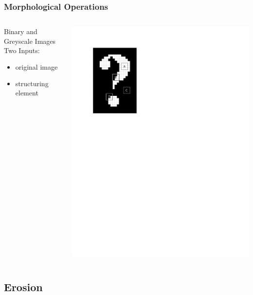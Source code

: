 \documentclass{beamer}
\begin{document}
\begin{frame}
\frametitle{Morphological Operations}
\begin{columns}
\begin{column}{0.5\textwidth}
Binary and Greyscale Images
\linebreak
\linebreak
Two Inputs:
\begin{itemize}
\item original image
\item structuring element
\end{itemize}
\end{column}
\begin{column}{0.5\textwidth}
\includegraphics[width=1\textwidth,trim={0 6.5in 4in 0},clip]{structuring_element_placement}
\end{column}
\end{columns}
\end{frame}

\subsection[Erosion]{Erosion}
\end{document}
